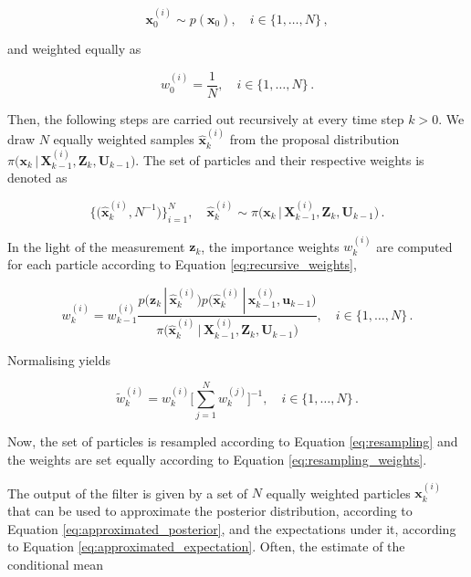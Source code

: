 \begin{equation}\label{eq:draw_initial_particles}
  \bm{x}^{(i)}_0 \sim p(\bm{x}_0), \quad i \in \{1, \dots, N\} \,,
\end{equation}

\noindent
and weighted equally as

\begin{equation}
  w^{(i)}_0 = \frac{1}{N}, \quad i \in \{1, \dots, N\} \,.
\end{equation}

\noindent
Then, the following steps are carried out recursively at every time step $k > 0$. We draw $N$ equally weighted samples $\hat{\bm{x}}^{(i)}_k$ from the proposal distribution $\pi\big(\bm{x}_k\,|\,\bm{X}^{(i)}_{k-1}, \bm{Z}_{k}, \bm{U}_{k-1}\big)$. The set of particles and their respective weights is denoted as


\begin{equation}
  \Big\{\big(\hat{\bm{x}}^{(i)}_{k}, N^{-1}\big)\Big\}_{i=1}^N, \quad \hat{\bm{x}}^{(i)}_k \sim \pi\big(\bm{x}_k\,|\,\bm{X}^{(i)}_{k-1}, \bm{Z}_{k}, \bm{U}_{k-1}\big)\,.
\end{equation}


In the light of the measurement $\bm{z}_k$, the importance weights $w^{(i)}_k$ are computed for each particle according to Equation \ref{eq:recursive_weights},

\begin{equation}\label{eq:weights_generic_particle}
   w^{(i)}_k = w^{(i)}_{k-1} \frac{p\big(\bm{z}_k\,|\,\hat{\bm{x}}^{(i)}_k\big) p\big(\hat{\bm{x}}^{(i)}_k\,|\,\bm{x}^{(i)}_{k-1}, \bm{u}_{k-1}\big)}{\pi\big(\hat{\bm{x}}^{(i)}_k\,|\,\bm{X}^{(i)}_{k-1}, \bm{Z}_{k}, \bm{U}_{k-1}\big)}, \quad i \in \{1, \dots, N\}\,.
\end{equation}

\noindent
Normalising yields

\begin{equation}
  \tilde{w}^{(i)}_k = w^{(i)}_{k} \Bigg[\sum^N_{j = 1} w^{(j)}_k\Bigg]^{-1}, \quad i \in \{1, \dots, N\}\,.
\end{equation}

\noindent
Now, the set of particles is resampled according to Equation \ref{eq:resampling} and the weights are set equally according to Equation \ref{eq:resampling_weights}.


The output of the filter is given by a set of $N$ equally weighted particles $\bm{x}^{(i)}_k$ that can be used to approximate the posterior distribution, according to Equation \ref{eq:approximated_posterior}, and the expectations under it, according to Equation \ref{eq:approximated_expectation}. Often, the estimate of the conditional mean


